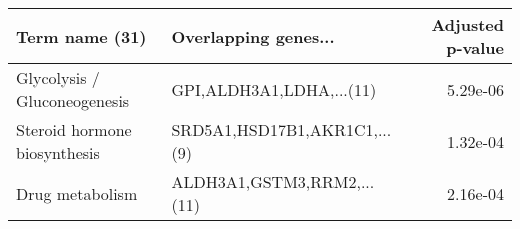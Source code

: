 \begin{tabular}{llr}
\toprule
              Term name (31) &         Overlapping genes... &  Adjusted p-value \\
\midrule
Glycolysis / Gluconeogenesis &     GPI,ALDH3A1,LDHA,...(11) &          5.29e-06 \\
Steroid hormone biosynthesis & SRD5A1,HSD17B1,AKR1C1,...(9) &          1.32e-04 \\
             Drug metabolism &   ALDH3A1,GSTM3,RRM2,...(11) &          2.16e-04 \\
\bottomrule
\end{tabular}
